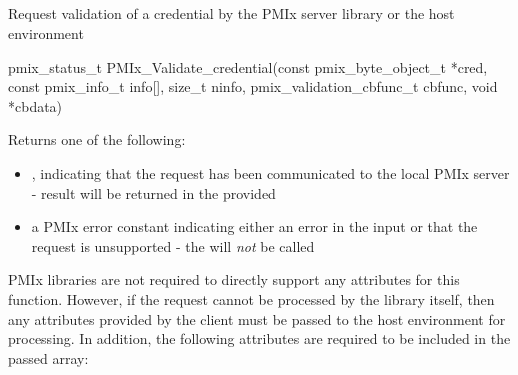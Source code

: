 \subsection{}

\summary

Request validation of a credential by the \ac{PMIx} server library or the host environment

\format

\cspecificstart
\begin{codepar}
pmix_status_t PMIx_Validate_credential(const pmix_byte_object_t *cred,
                             const pmix_info_t info[], size_t ninfo,
                             pmix_validation_cbfunc_t cbfunc, void *cbdata)
\end{codepar}
\cspecificend

\begin{arglist}
\end{arglist}

Returns one of the following:

\begin{itemize}
    \item {}, indicating that the request has been communicated to the local \ac{PMIx} server - result will be returned in the provided 
    \item a \ac{PMIx} error constant indicating either an error in the input or that the request is unsupported - the  will \textit{not} be called
\end{itemize}

\reqattrstart
\ac{PMIx} libraries are not required to directly support any attributes for this function. However, if the request cannot be processed by the library itself, then any attributes provided by the client must be passed to the host environment for processing. In addition, the following attributes are required to be included in the passed  array:


